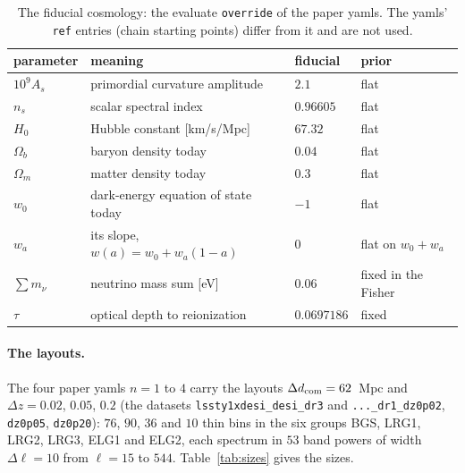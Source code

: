 \documentclass[11pt]{article}
\newcommand{\us}{\_\allowbreak}
\begin{document}
\begin{table}[tbp]
  \centering
  \begin{tabular}{llll}
    \hline
    parameter & meaning & fiducial & prior \\
    \hline
    $10^9 A_s$ & primordial curvature amplitude & $2.1$ & flat \\
    $n_s$ & scalar spectral index & $0.96605$ & flat \\
    $H_0$ & Hubble constant [km/s/Mpc] & $67.32$ & flat \\
    $\Omega_b$ & baryon density today & $0.04$ & flat \\
    $\Omega_m$ & matter density today & $0.3$ & flat \\
    $w_0$ & dark-energy equation of state today & $-1$ & flat \\
    $w_a$ & its slope, $w(a) = w_0 + w_a(1 - a)$ & $0$ & flat on $w_0 + w_a$ \\
    $\sum m_\nu$ & neutrino mass sum [eV] & $0.06$ & fixed in the Fisher \\
    $\tau$ & optical depth to reionization & $0.0697186$ & fixed \\
    \hline
  \end{tabular}
  \caption{The fiducial cosmology: the evaluate \texttt{override} of the
    paper yamls.  The yamls' \texttt{ref} entries (chain starting points)
    differ from it and are not used.}
  \label{tab:fidcosmo}
\end{table}

\paragraph{The layouts.}
The four paper yamls $n = 1$ to $4$ carry the layouts
$\Delta d_{\rm com} = 62$~Mpc and $\Delta z = 0.02$, $0.05$, $0.2$
(the datasets \texttt{lssty1xdesi\us desi\us dr3} and
\texttt{...\us dr1\us dz0p02}, \texttt{dz0p05}, \texttt{dz0p20}): $76$,
$90$, $36$ and $10$ thin bins in the six groups BGS, LRG1, LRG2, LRG3,
ELG1 and ELG2, each spectrum in $53$ band powers of width
$\Delta\ell = 10$ from $\ell = 15$ to $544$.
Table~\ref{tab:sizes} gives the sizes.
\end{document}
